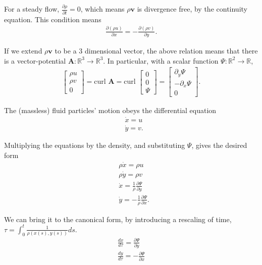 \begin{solution}[8.2]
For a steady flow, $\frac{\partial \rho}{\partial t} = 0$, which means $\rho \mathbf{v}$ is divergence free, by the continuity equation. This condition means
\begin{align}
\frac{\partial(\rho u)}{\partial x} = -\frac{\partial (\rho v)}{\partial y}.
\end{align}

If we extend $\rho \mathbf{v}$ to be a 3 dimensional vector, the above relation means that there is a vector-potential $\mathbf{A}:\mathbb{R}^3\to \mathbb{R}^3$. In particular, with a scalar function $\Psi:\mathbb{R}^2 \to \mathbb{R}$,
\begin{align}
\begin{bmatrix}\rho u \\ \rho v\\ 0 \end{bmatrix}=\text{curl } \mathbf{A} = \text{curl } \begin{bmatrix} 0 \\ 0 \\ \Psi \end{bmatrix} = \begin{bmatrix} \partial_y \Psi \\ -\partial_x \Psi \\ 0 \end{bmatrix}. 
\end{align}

The (massless) fluid particles' motion obeys the differential equation
\begin{align}
    &\dot{x} = u \\
    &\dot{y} = v.
\end{align}

Multiplying the equations by the density, and substituting $\Psi$, gives the desired form
\begin{align}
    &\rho\dot{x} = \rho u \\
    &\rho\dot{y} = \rho v \\
    &\dot{x} = \frac{1}{\rho}\frac{\partial \Psi}{\partial y}\\
    &\dot{y} = -\frac{1}{\rho}\frac{\partial \Psi}{\partial x}. 
\end{align}

We can bring it to the canonical form, by introducing a rescaling of time, $\tau = \int_0^t\frac{1}{\rho(x(s),y(s))}ds$.
\begin{align}
    \frac{d x}{d\tau} = \frac{\partial \Psi}{\partial y} \\
    \frac{d y}{d\tau} = -\frac{\partial \Psi}{\partial x} 
\end{align}



\end{solution}
